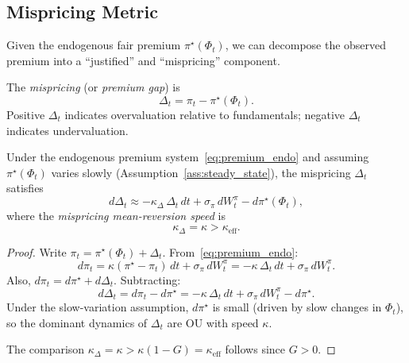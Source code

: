 \subsection{Mispricing Metric}
\label{sec:mispricing}

Given the endogenous fair premium $\pi^\star(\Phi_t)$, we can decompose the
observed premium into a ``justified'' and ``mispricing'' component.

\begin{definition}
  \label{def:mispricing}
  The \emph{mispricing} (or \emph{premium gap}) is
  \begin{equation}
    \label{eq:delta_def}
    \Delta_t = \pi_t - \pi^\star(\Phi_t).
  \end{equation}
  Positive $\Delta_t$ indicates overvaluation relative to fundamentals;
  negative $\Delta_t$ indicates undervaluation.
\end{definition}

\begin{proposition}
  \label{prop:delta_dynamics}
  Under the endogenous premium system~\eqref{eq:premium_endo} and assuming
  $\pi^\star(\Phi_t)$ varies slowly (Assumption~\ref{ass:steady_state}), the
  mispricing $\Delta_t$ satisfies
  \begin{equation}
    \label{eq:delta_ou}
    d\Delta_t \approx -\kappa_\Delta\,\Delta_t\,dt
      + \sigma_\pi\,dW_t^\pi
      - d\pi^\star(\Phi_t),
  \end{equation}
  where the \emph{mispricing mean-reversion speed} is
  \begin{equation}
    \label{eq:kappa_delta}
    \boxed{
      \kappa_\Delta = \kappa > \kappa_{\mathrm{eff}}.
    }
  \end{equation}
\end{proposition}

\begin{proof}
  Write $\pi_t = \pi^\star(\Phi_t) + \Delta_t$.  From~\eqref{eq:premium_endo}:
  \[
    d\pi_t = \kappa(\pi^\star - \pi_t)\,dt + \sigma_\pi\,dW_t^\pi
           = -\kappa\,\Delta_t\,dt + \sigma_\pi\,dW_t^\pi.
  \]
  Also, $d\pi_t = d\pi^\star + d\Delta_t$.  Subtracting:
  \[
    d\Delta_t = d\pi_t - d\pi^\star
              = -\kappa\,\Delta_t\,dt + \sigma_\pi\,dW_t^\pi - d\pi^\star.
  \]
  Under the slow-variation assumption, $d\pi^\star$ is small (driven by slow
  changes in $\Phi_t$), so the dominant dynamics of $\Delta_t$ are OU with
  speed $\kappa$.

  The comparison $\kappa_\Delta = \kappa > \kappa(1-G) = \kappa_{\mathrm{eff}}$
  follows since $G > 0$.
\end{proof}

